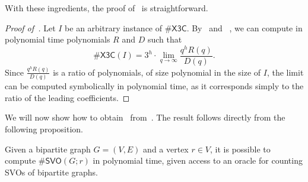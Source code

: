 \documentclass[11pt]{amsart}
\begin{document}
With these ingredients, the proof of~ is straightforward.
\begin{proof}[Proof of~]
    Let $I$ be an arbitrary instance of $\#\mathsf{X3C}$.
    By~ and ~, we can compute in polynomial time polynomials $R$ and $D$ such that
    \[
        \#\mathsf{X3C}(I) = 3^h \cdot \lim_{q \to \infty} \frac{q^h R(q)}{D(q)}.
    \]
    Since $\frac{q^hR(q)}{D(q)}$ is a ratio of polynomials, of size polynomial in the size of $I$, the limit can be computed symbolically in polynomial time, as it corresponds simply to the ratio of the leading coefficients.
\end{proof}

We will now show how to obtain~ from~. The result follows directly from the following proposition.

\begin{proposition}\label{prop:unrooting_SVO}
Given a bipartite graph $G = (V, E)$ and a vertex $r \in V$, it is possible to compute $\#\mathsf{SVO}(G; r)$ in polynomial time, given access to an oracle for counting SVOs of bipartite graphs.
\end{proposition}
\end{document}
